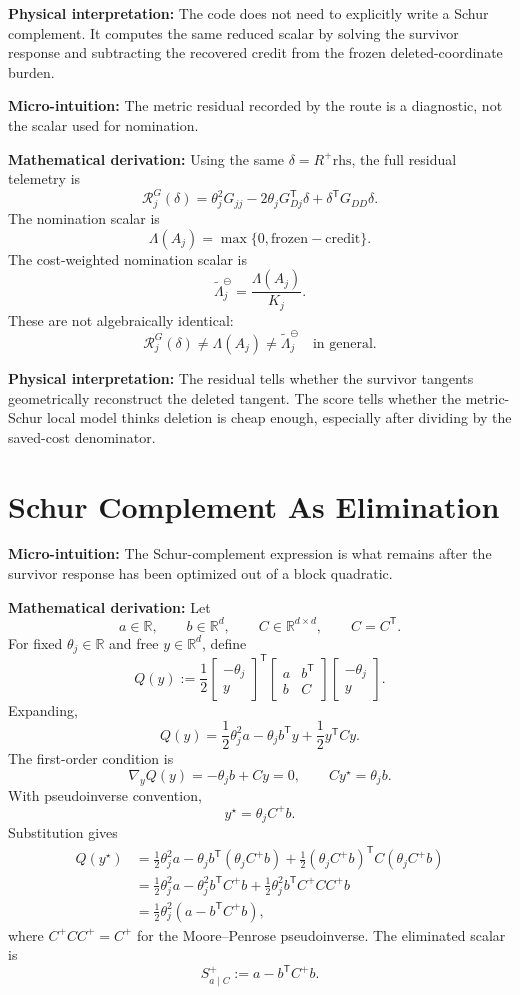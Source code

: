 \documentclass[10pt,twocolumn]{article}
\newcommand{\rhs}{\mathrm{rhs}}
\newcommand{\blocktitle}[1]{\vspace{2pt}\noindent\textbf{#1}\space}
\newcommand{\micro}[1]{\blocktitle{Micro-intuition:} #1}
\newcommand{\deriv}{\blocktitle{Mathematical derivation:}}
\newcommand{\phys}[1]{\blocktitle{Physical interpretation:} #1}
\begin{document}
\phys{The code does not need to explicitly write a Schur complement. It computes the same reduced scalar by solving the survivor response and subtracting the recovered credit from the frozen deleted-coordinate burden.}

\micro{The metric residual recorded by the route is a diagnostic, not the scalar used for nomination.}

\deriv
Using the same \(\delta=R^+\rhs\), the full residual telemetry is
\[
\mathcal R_j^G(\delta)
=
\theta_j^2G_{jj}
-2\theta_jG_{Dj}^{\mathsf T}\delta
+
\delta^{\mathsf T}G_{DD}\delta.
\]
The nomination scalar is
\[
\Lambda(A_j)
=
\max\{0,\mathrm{frozen}-\mathrm{credit}\}.
\]
The cost-weighted nomination scalar is
\[
\widetilde{\Lambda}_j^\ominus
=
\frac{\Lambda(A_j)}{K_j}.
\]
These are not algebraically identical:
\[
\mathcal R_j^G(\delta)
\ne
\Lambda(A_j)
\ne
\widetilde{\Lambda}_j^\ominus
\quad
\text{in general}.
\]

\phys{The residual tells whether the survivor tangents geometrically reconstruct the deleted tangent. The score tells whether the metric-Schur local model thinks deletion is cheap enough, especially after dividing by the saved-cost denominator.}

\section*{Schur Complement As Elimination}

\micro{The Schur-complement expression is what remains after the survivor response has been optimized out of a block quadratic.}

\deriv
Let
\[
a\in\mathbb R,
\qquad
b\in\mathbb R^d,
\qquad
C\in\mathbb R^{d\times d},
\qquad
C=C^{\mathsf T}.
\]
For fixed \(\theta_j\in\mathbb R\) and free \(y\in\mathbb R^d\), define
\[
Q(y)
:=
\frac12
\begin{bmatrix}
-\theta_j\\
y
\end{bmatrix}^{\mathsf T}
\begin{bmatrix}
a & b^{\mathsf T}\\
b & C
\end{bmatrix}
\begin{bmatrix}
-\theta_j\\
y
\end{bmatrix}.
\]
Expanding,
\[
Q(y)
=
\frac12\theta_j^2a
-
\theta_jb^{\mathsf T}y
+
\frac12y^{\mathsf T}Cy.
\]
The first-order condition is
\[
\nabla_yQ(y)
=
-\theta_jb+Cy=0,
\qquad
Cy^\star=\theta_jb.
\]
With pseudoinverse convention,
\[
y^\star=\theta_jC^+b.
\]
Substitution gives
\[
\begin{aligned}
Q(y^\star)
&=
\frac12\theta_j^2a
-
\theta_jb^{\mathsf T}(\theta_jC^+b)
+
\frac12(\theta_jC^+b)^{\mathsf T}C(\theta_jC^+b)
\\
&=
\frac12\theta_j^2a
-
\theta_j^2b^{\mathsf T}C^+b
+
\frac12\theta_j^2b^{\mathsf T}C^+CC^+b
\\
&=
\frac12\theta_j^2
\left(
a-b^{\mathsf T}C^+b
\right),
\end{aligned}
\]
where \(C^+CC^+ = C^+\) for the Moore--Penrose pseudoinverse. The eliminated scalar is
\[
S_{a\mid C}^+
:=
a-b^{\mathsf T}C^+b.
\]
\end{document}
